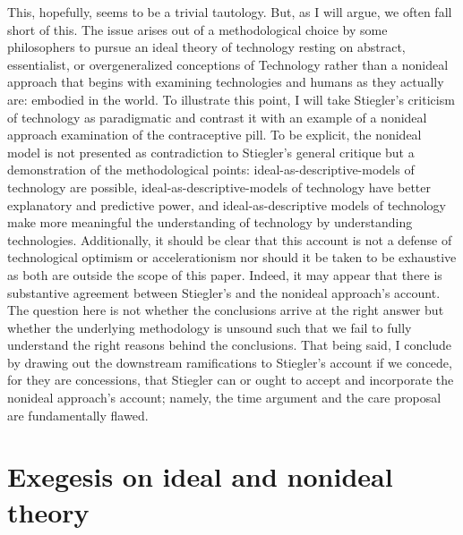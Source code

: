 \documentclass[letterpaper,notitlepage,12pt]{article}
\begin{document}
This, hopefully, seems to be a trivial tautology.
But, as I will argue, we often fall short of this.
The issue arises out of a methodological choice by some philosophers to pursue
an ideal theory of technology resting on abstract, essentialist, or
overgeneralized conceptions of Technology rather than a nonideal approach that
begins with examining technologies and humans as they actually are: embodied in
the world.
To illustrate this point, I will take Stiegler's criticism of technology as
paradigmatic and contrast it with an example of a nonideal approach examination
of the contraceptive pill. To be explicit, the nonideal model is not presented
as contradiction to Stiegler's general critique but a demonstration of the
methodological points: ideal-as-descriptive-models of technology are
possible, ideal-as-descriptive-models of technology have better explanatory
and predictive power, and ideal-as-descriptive models of technology make more
meaningful the understanding of technology by understanding technologies.
Additionally, it should be clear that this account is not a defense of
technological optimism or accelerationism nor should it be taken to be
exhaustive as both are outside the scope of this paper.
Indeed, it may appear that there is substantive agreement between Stiegler's and
the nonideal approach's account.
The question here is not whether the conclusions arrive at the right answer but
whether the underlying methodology is unsound such that we fail to fully
understand the right reasons behind the conclusions.
That being said, I conclude by drawing out the downstream ramifications to
Stiegler's account if we concede, for they are concessions, that Stiegler can or
ought to accept and incorporate the nonideal approach's account; namely, the
time argument and the care proposal are fundamentally flawed.

\section{Exegesis on ideal and nonideal theory}
\end{document}
